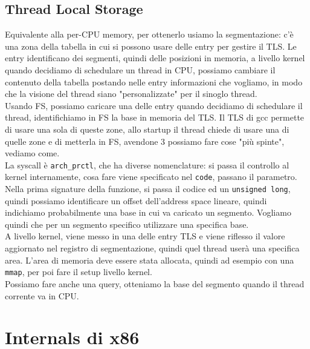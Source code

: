 \documentclass[12pt, oneside]{extbook}
\begin{document}
\subsection{Thread Local Storage}
Equivalente alla per-CPU memory, per ottenerlo usiamo la segmentazione: c'è una zona della tabella in cui si possono usare delle entry per gestire il TLS. Le entry identificano dei segmenti, quindi delle posizioni in memoria, a livello kernel quando decidiamo di schedulare un thread in CPU, possiamo cambiare il contenuto della tabella postando nelle entry informazioni che vogliamo, in modo che la visione del thread siano "personalizzate" per il sinoglo thread.\\ Usando FS, possiamo caricare una delle entry quando decidiamo di schedulare il thread, identifichiamo in FS la base in memoria del TLS. Il TLS di gcc permette di usare una sola di queste zone, allo startup il thread chiede di usare una di quelle zone e di metterla in FS, avendone 3 possiamo fare cose "più spinte", vediamo come.\\ La syscall è \texttt{arch\_prctl}, che ha diverse nomenclature: si passa il controllo al kernel internamente, cosa fare viene specificato nel \texttt{code}, passano il parametro.\\ Nella prima signature della funzione, si passa il codice ed un \texttt{unsigned long}, quindi possiamo identificare un offset dell'address space lineare, quindi indichiamo probabilmente una base in cui va caricato un segmento. Vogliamo quindi che per un segmento specifico utilizzare una specifica base.\\A livello kernel, viene messo in una delle entry TLS e viene riflesso il valore aggiornato nel registro di segmentazione, quindi quel thread userà una specifica area. L'area di memoria deve essere stata allocata, quindi ad esempio con una \texttt{mmap}, per poi fare il setup livello kernel.\\ Possiamo fare anche una query, otteniamo la base del segmento quando il thread corrente va in CPU.
\section{Internals di x86}
\end{document}
